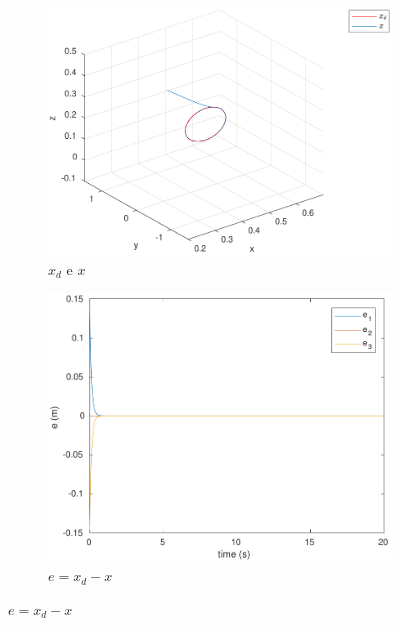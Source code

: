 \documentclass[a4paper,11pt]{article}
\theoremstyle{mytheor}
\begin{document}
\begin{figure}[!ht]
\centering
  \begin{minipage}{\linewidth}
  \centering
    \begin{subfigure}[b]{0.4\textwidth}
    \includegraphics[width=1\textwidth]{figs/ex1_b_1_x.pdf}
    \caption{$x_d$ e $x$}
    \label{fig:ex1_b_1_x}
    \end{subfigure}
  \end{minipage}
  \begin{minipage}{\linewidth}
  \centering
    \begin{subfigure}[b]{0.4\textwidth}
    \includegraphics[width=1\textwidth]{figs/ex1_b_1_e.pdf}
    \caption{$e = x_d - x$}
    \label{fig:ex1_b_1_e}

\end{subfigure}
\end{minipage}
\end{figure}
\end{document}
